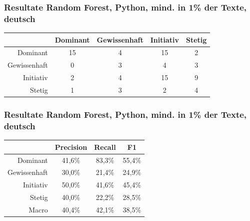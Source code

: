 \documentclass{beamer}
\begin{document}
\begin{frame}
\frametitle{Resultate Random Forest, Python, mind. in 1\% der Texte, deutsch}
\begin{center}
\begin{tabular}{r|c|c|c|c|}
 &  Dominant  & Gewissenhaft & Initiativ & Stetig\\
\hline
Dominant & 15 & 4 & 15 & 2 \\
Gewissenhaft & 0 & 3 & 4 & 3\\
Initiativ & 2 & 4 & 15 & 9\\
Stetig & 1 & 3 & 2 & 4
\end{tabular}
\end{center}
\end{frame}
\begin{frame}
\frametitle{Resultate Random Forest, Python, mind. in 1\% der Texte, deutsch}
\begin{center}
\begin{tabular}{r|c|c|c|}
 &  Precision  & Recall & F1 \\
\hline
Dominant     & 41,6\% & 83,3\% & 55,4\% \\
Gewissenhaft & 30,0\% & 21,4\% & 24,9\% \\
Initiativ    & 50,0\% & 41,6\% & 45,4\% \\
Stetig       & 40,0\% & 22,2\% & 28,5\% \\
\hline
Macro        & 40,4\% & 42,1\% & 38,5\%
\end{tabular}
\end{center}
\end{frame}
\end{document}
